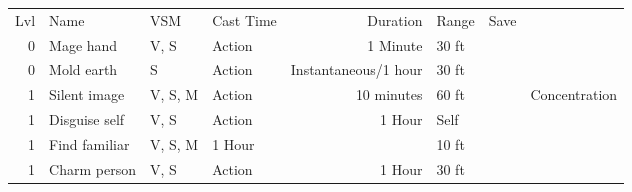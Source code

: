 {\scriptsize
\begin{tabular}{|r l l l r l l l|}
\hline
Lvl &
Name &
VSM &
Cast Time &
Duration &
Range &
Save &
\\

0 &
Mage hand &
V, S &
Action &
1 Minute &
30 ft &
&
\\


0 &
Mold earth &
S &
Action &
Instantaneous/1 hour &
30 ft &
&
\\

\hline

1 &
Silent image &
V, S, M &
Action &
10 minutes &
60 ft &
&
Concentration \\


1 &
Disguise self &
V, S &
Action &
1 Hour &
Self &
&
\\


1 &
Find familiar &
V, S, M &
1 Hour &
&
10 ft &
&
\\


1 &
Charm person &
V, S &
Action &
1 Hour &
30 ft &
&
\\

\hline
\end{tabular}

} %
